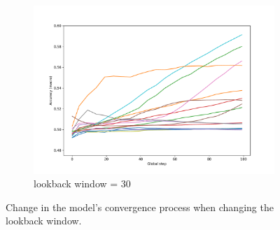 \documentclass[aps,prb,groupedaddress,twocolumn,showpacs,dvipdfmx,superscriptaddress,pdftex]{revtex4-2}
\begin{document}
\begin{figure}[H]
\begin{subfigure}[b]{\linewidth}
        \centering
        \includegraphics[width=\textwidth]{img/lstm_30.pdf}
        \caption{lookback window = 30}
        \label{fig:image3}
    \end{subfigure}
    \caption{Change in the model's convergence process when changing the lookback window.}
    \label{fig:three_images}
\end{figure}
\end{document}
